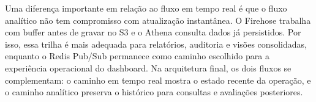 ﻿\documentclass{article}
\begin{document}
Uma diferen\c{c}a importante em rela\c{c}\~ao ao fluxo em tempo real \'e que o fluxo anal\'itico n\~ao tem compromisso com atualiza\c{c}\~ao instant\^anea. O Firehose trabalha com buffer antes de gravar no S3 e o Athena consulta dados j\'a persistidos. Por isso, essa trilha \'e mais adequada para relat\'orios, auditoria e vis\~oes consolidadas, enquanto o Redis Pub/Sub permanece como caminho escolhido para a experi\^encia operacional do dashboard. Na arquitetura final, os dois fluxos se complementam: o caminho em tempo real mostra o estado recente da opera\c{c}\~ao, e o caminho anal\'itico preserva o hist\'orico para consultas e avalia\c{c}\~oes posteriores.
\end{document}
